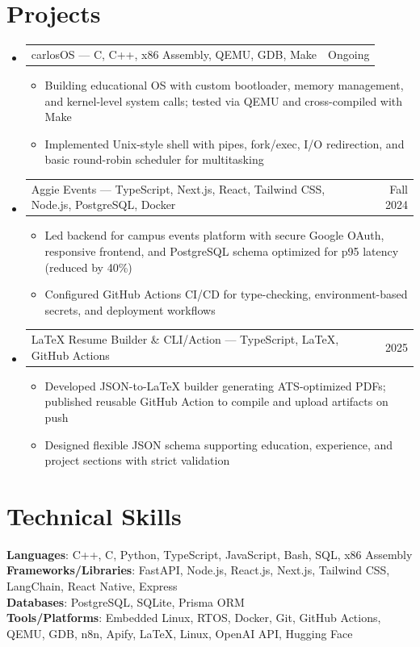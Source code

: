 \documentclass[letterpaper,11pt]{article}
\makeatletter
\newcommand{\resumeItem}[1]{
  \item\small{{#1 \vspace{-2pt}}}
}
\newcommand{\resumeProjectHeading}[2]{
    \item
    \begin{tabular*}{0.97\textwidth}{l@{\extracolsep{\fill}}r}
      \small#1 & #2 \\
    \end{tabular*}\vspace{-7pt}
}
\newcommand{\resumeSubHeadingListStart}{\begin{itemize}[leftmargin=0.15in, label={}]}
\newcommand{\resumeSubHeadingListEnd}{\end{itemize}}
\newcommand{\resumeItemListStart}{\begin{itemize}}
\newcommand{\resumeItemListEnd}{\end{itemize}\vspace{-5pt}}
\makeatother
\begin{document}
\section{Projects}
\resumeSubHeadingListStart
\resumeProjectHeading
  {carlosOS — C, C++, x86 Assembly, QEMU, GDB, Make}{Ongoing}
  \resumeItemListStart
    \resumeItem{Building educational OS with custom bootloader, memory management, and kernel-level system calls; tested via QEMU and cross-compiled with Make}
    \resumeItem{Implemented Unix-style shell with pipes, fork/exec, I/O redirection, and basic round-robin scheduler for multitasking}
  \resumeItemListEnd

\resumeProjectHeading
  {Aggie Events — TypeScript, Next.js, React, Tailwind CSS, Node.js, PostgreSQL, Docker}{Fall 2024}
  \resumeItemListStart
    \resumeItem{Led backend for campus events platform with secure Google OAuth, responsive frontend, and PostgreSQL schema optimized for p95 latency (reduced by 40\%)}
    \resumeItem{Configured GitHub Actions CI/CD for type-checking, environment-based secrets, and deployment workflows}
  \resumeItemListEnd

\resumeProjectHeading
  {LaTeX Resume Builder \& CLI/Action — TypeScript, LaTeX, GitHub Actions}{2025}
  \resumeItemListStart
    \resumeItem{Developed JSON-to-LaTeX builder generating ATS-optimized PDFs; published reusable GitHub Action to compile and upload artifacts on push}
    \resumeItem{Designed flexible JSON schema supporting education, experience, and project sections with strict validation}
  \resumeItemListEnd
\resumeSubHeadingListEnd

\section{Technical Skills}
\begin{itemize}[leftmargin=0.15in, label={}]
  \small{\item{
    \textbf{Languages}{: C++, C, Python, TypeScript, JavaScript, Bash, SQL, x86 Assembly} \\
    \textbf{Frameworks/Libraries}{: FastAPI, Node.js, React.js, Next.js, Tailwind CSS, LangChain, React Native, Express} \\
    \textbf{Databases}{: PostgreSQL, SQLite, Prisma ORM} \\
    \textbf{Tools/Platforms}{: Embedded Linux, RTOS, Docker, Git, GitHub Actions, QEMU, GDB, n8n, Apify, LaTeX, Linux, OpenAI API, Hugging Face}
  }}
\end{itemize}
\end{document}
